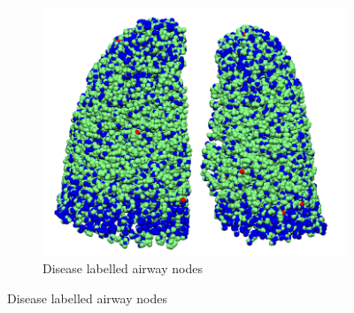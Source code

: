 \begin{figure}[htbp] 
\centering
\begin{subfigure}{.39\linewidth}%
  \includegraphics[width=\linewidth,trim={{.0\wd0} {.0\wd0} {.0\wd0} {.0\wd0}},clip]{ModelBasedAnalysis/Image/IPF501_DiseaseDistribution_BasedVentilation.png}
  \caption{Disease labelled airway nodes}
  \label{fig:DiseaseLabeling-a} 
\end{subfigure}

\end{figure}
